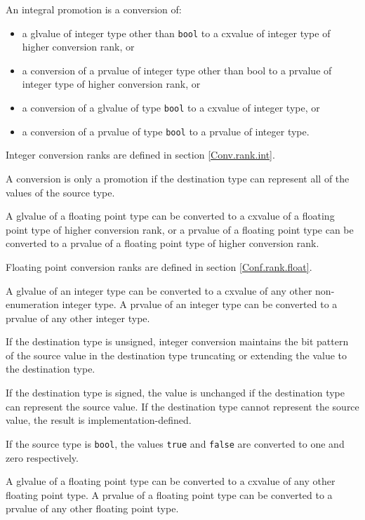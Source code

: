 \p An integral promotion is a conversion of:
\begin{itemize}
  \item a glvalue of integer type other than \texttt{bool} to a cxvalue of
  integer type of higher conversion rank, or
  \item a conversion of a prvalue of integer type other than bool to a prvalue
  of integer type of higher conversion rank, or
  \item a conversion of a glvalue of type \texttt{bool} to a cxvalue of integer
  type, or
  \item a conversion of a prvalue of type \texttt{bool} to a prvalue of integer
  type.
\end{itemize}

\p Integer conversion ranks are defined in section \ref{Conv.rank.int}.

\p A conversion is only a promotion if the destination type can represent all of
the values of the source type.


\p A glvalue of a floating point type can be converted to a cxvalue of a
floating point type of higher conversion rank, or a prvalue of a floating point
type can be converted to a prvalue of a floating point type of higher conversion
rank.

\p Floating point conversion ranks are defined in section \ref{Conf.rank.float}.


\p A glvalue of an integer type can be converted to a cxvalue of any other
non-enumeration integer type. A prvalue of an integer type can be converted to a
prvalue of any other integer type.

\p If the destination type is unsigned, integer conversion maintains the bit pattern
of the source value in the destination type truncating or extending the value to
the destination type.

\p If the destination type is signed, the value is unchanged if the destination
type can represent the source value. If the destination type cannot represent
the source value, the result is implementation-defined.

\p If the source type is \texttt{bool}, the values \texttt{true} and
\texttt{false} are converted to one and zero respectively.


\p A glvalue of a floating point type can be converted to a cxvalue of any other
floating point type. A prvalue of a floating point type can be converted to a
prvalue of any other floating point type.

